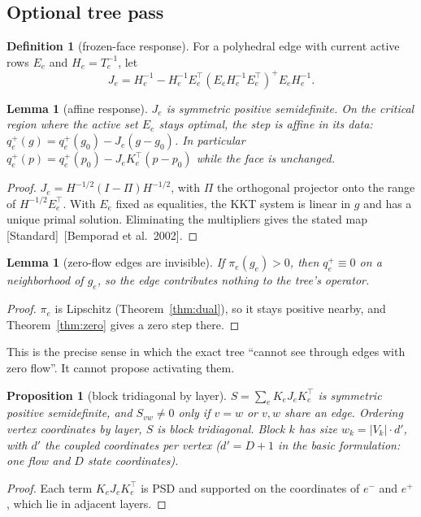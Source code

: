\documentclass[11pt]{article}
\newcommand{\std}{\textcolor{muted}{[Standard]}\ }
\theoremstyle{plain}
\newtheorem{proposition}[theorem]{Proposition}
\newtheorem{lemma}[theorem]{Lemma}
\theoremstyle{definition}
\newtheorem{definition}[theorem]{Definition}
\theoremstyle{remark}
\begin{document}
\subsection{Optional tree pass}\label{sec:tree}
\begin{definition}[frozen-face response]\label{def:Je}
For a polyhedral edge with current active rows $E_e$ and $H_e=T_e^{-1}$, let
\[
J_e=H_e^{-1}-H_e^{-1}E_e^\top(E_eH_e^{-1}E_e^\top)^{+}E_eH_e^{-1}.
\]
\end{definition}

\begin{lemma}[affine response]\label{lem:affine}
$J_e$ is symmetric positive semidefinite. On the critical region where the active set $E_e$ stays optimal, the step is affine in its data: $q^+_e(g)=q^+_e(g_0)-J_e(g-g_0)$. In particular $q^+_e(p)=q^+_e(p_0)-J_eK_e^\top(p-p_0)$ while the face is unchanged.
\end{lemma}
\begin{proof}
$J_e=H^{-1/2}(I-\Pi)H^{-1/2}$, with $\Pi$ the orthogonal projector onto the range of $H^{-1/2}E_e^\top$. With $E_e$ fixed as equalities, the KKT system is linear in $g$ and has a unique primal solution. Eliminating the multipliers gives the stated map \std[Bemporad et al.\ 2002].
\end{proof}

\begin{lemma}[zero-flow edges are invisible]\label{lem:invisible}
If $\pi_e(g_e)>0$, then $q^+_e\equiv0$ on a neighborhood of $g_e$, so the edge contributes nothing to the tree's operator.
\end{lemma}
\begin{proof}
$\pi_e$ is Lipschitz (Theorem~\ref{thm:dual}), so it stays positive nearby, and Theorem~\ref{thm:zero} gives a zero step there.
\end{proof}
This is the precise sense in which the exact tree ``cannot see through edges with zero flow''. It cannot propose activating them.

\begin{proposition}[block tridiagonal by layer]\label{prop:btd}
$S=\sum_eK_eJ_eK_e^\top$ is symmetric positive semidefinite, and $S_{vw}\neq0$ only if $v=w$ or $v,w$ share an edge. Ordering vertex coordinates by layer, $S$ is block tridiagonal. Block $k$ has size $w_k=|V_k|\cdot d'$, with $d'$ the coupled coordinates per vertex ($d'=D+1$ in the basic formulation: one flow and $D$ state coordinates).
\end{proposition}
\begin{proof}
Each term $K_eJ_eK_e^\top$ is PSD and supported on the coordinates of $e^-$ and $e^+$, which lie in adjacent layers.
\end{proof}
\end{document}
